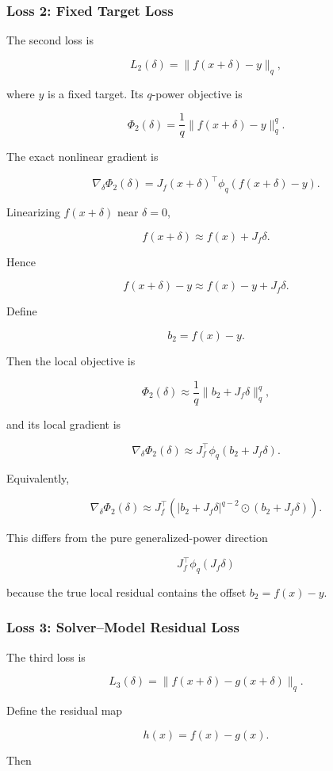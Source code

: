 \documentclass{article}
\begin{document}
\subsubsection{Loss 2: Fixed Target Loss}

The second loss is

\[
L_2(\delta)
=
\|f(x+\delta)-y\|_q,
\]

where \(y\) is a fixed target. Its \(q\)-power objective is

\[
\Phi_2(\delta)
=
\frac{1}{q}
\|f(x+\delta)-y\|_q^q.
\]

The exact nonlinear gradient is

\[
\nabla_\delta \Phi_2(\delta)
=
J_f(x+\delta)^\top
\phi_q
\left(
f(x+\delta)-y
\right).
\]

Linearizing \(f(x+\delta)\) near \(\delta=0\),

\[
f(x+\delta)
\approx
f(x)+J_f\delta.
\]

Hence

\[
f(x+\delta)-y
\approx
f(x)-y+J_f\delta.
\]

Define

\[
b_2=f(x)-y.
\]

Then the local objective is

\[
\Phi_2(\delta)
\approx
\frac{1}{q}
\|b_2+J_f\delta\|_q^q,
\]

and its local gradient is

\[
\nabla_\delta \Phi_2(\delta)
\approx
J_f^\top
\phi_q
\left(
b_2+J_f\delta
\right).
\]

Equivalently,

\[
\nabla_\delta \Phi_2(\delta)
\approx
J_f^\top
\left(
|b_2+J_f\delta|^{q-2}
\odot
(b_2+J_f\delta)
\right).
\]

This differs from the pure generalized-power direction

\[
J_f^\top\phi_q(J_f\delta)
\]

because the true local residual contains the offset \(b_2=f(x)-y\).

\subsubsection{Loss 3: Solver--Model Residual Loss}

The third loss is

\[
L_3(\delta)
=
\|f(x+\delta)-g(x+\delta)\|_q.
\]

Define the residual map

\[
h(x)=f(x)-g(x).
\]

Then
\end{document}
